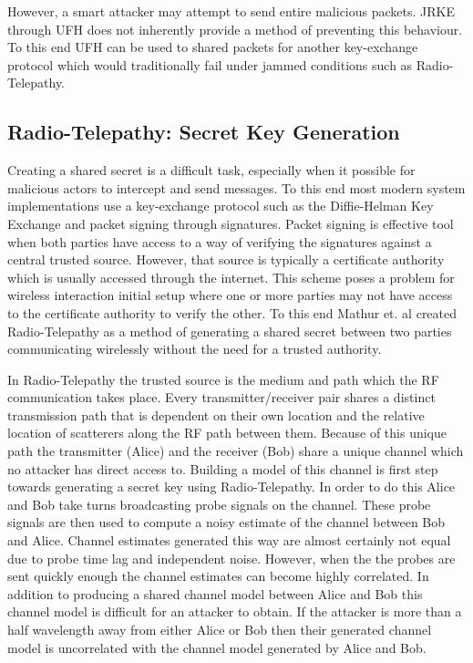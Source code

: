 \documentclass[sigconf, anonymous]{acmart}
\begin{document}
    
    

However, a smart attacker may attempt to send entire malicious packets. JRKE through UFH does not inherently provide a method of preventing this behaviour. To this end UFH can be used to shared packets for another key-exchange protocol which would traditionally fail under jammed conditions such as Radio-Telepathy.

\subsection{Radio-Telepathy: Secret Key Generation}
\label{sec:radio_telepathy}

Creating a shared secret is a difficult task, especially when it possible for malicious actors to intercept and send messages. To this end most modern system implementations use a key-exchange protocol such as the Diffie-Helman Key Exchange and packet signing through signatures. Packet signing is effective tool when both parties have access to a way of verifying the signatures against a central trusted source. However, that source is typically a certificate authority which is usually accessed through the internet. This scheme poses a problem for wireless interaction initial setup where one or more parties may not have access to the certificate authority to verify the other. To this end Mathur et. al created Radio-Telepathy as a method of generating a shared secret between two parties communicating wirelessly without the need for a trusted authority\cite{mathur2008radio}.

In Radio-Telepathy the trusted source is the medium and path which the RF communication takes place. Every transmitter/receiver pair shares a distinct transmission path that is dependent on their own location and the relative location of scatterers along the RF path between them. Because of this unique path the transmitter (Alice) and the receiver (Bob) share a unique channel which no attacker has direct access to. Building a model of this channel is first step towards generating a secret key using Radio-Telepathy. In order to do this Alice and Bob take turns broadcasting probe signals on the channel. These probe signals are then used to compute a noisy estimate of the channel between Bob and Alice. Channel estimates generated this way are almost certainly not equal due to probe time lag and independent noise. However, when the the probes are sent quickly enough the channel estimates can become highly correlated. In addition to producing a shared channel model between Alice and Bob this channel model is difficult for an attacker to obtain. If the attacker is more than a half wavelength away from either Alice or Bob then their generated channel model is uncorrelated with the channel model generated by Alice and Bob\cite{jakes1974microwave}.
\end{document}
